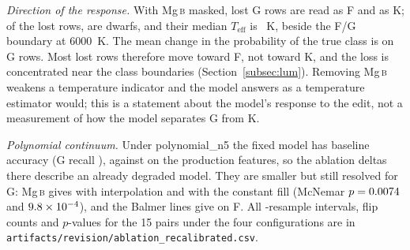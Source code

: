 \documentclass[11pt,a4paper]{article}
\newcommand{\Mgb}{Mg\,\textsc{b}\xspace}
\newcommand{\NaD}{Na\,\textsc{d}\xspace}
\newcommand{\CaI}{Ca\,\textsc{i}\xspace}
\newcommand{\FeCr}{Fe\,\textsc{i}/Cr\,\textsc{i}\xspace}
\newcommand{\Teff}{$T_{\mathrm{eff}}$\xspace}
\newcommand{\dA}{\Delta A}
\begin{document}
\emph{Direction of the response.} With \Mgb masked, \ablDestPrimMgGToF{} lost G rows are read as F and \ablDestPrimMgGToK{} as K; of the \focusMgGLost{} lost rows, \focusMgGDwarf{} are dwarfs, and their median \Teff is \focusMgGTeff~K, beside the F/G boundary at 6000~K. The mean change in the probability of the true class is \ablPrimMgGDp{} on G rows. Most lost rows therefore move toward F, not toward K, and the loss is concentrated near the class boundaries (Section~\ref{subsec:lum}). Removing \Mgb weakens a temperature indicator and the model answers as a temperature estimator would; this is a statement about the model's response to the edit, not a measurement of how the model separates G from K.

\emph{Polynomial continuum.} Under polynomial\_n5 the fixed model has baseline accuracy \ablBaseAccPoly{} (G recall \ablBaseRecGPoly), against \ablBaseAccPrim{} on the production features, so the ablation deltas there describe an already degraded model. They are smaller but still resolved for G: \Mgb gives \ablPolyMgGDelta{} with interpolation and \ablPolyConstMgGDelta{} with the constant fill (McNemar $p = 0.0074$ and $9.8\times10^{-4}$), and the Balmer lines give \ablPolyHbFDelta{} on F. All \ablNBoot-resample intervals, flip counts and $p$-values for the 15 pairs under the four configurations are in \texttt{artifacts/revision/ablation\_recalibrated.csv}.

\begin{table}[ht]
\centering
\caption{Masked-line ablation of the fixed production classifier on the \nTest{} test spectra. Production continuum, linear-interpolation fill, class-matched null of \ablNControls{} bin-matched random windows, \ablNBoot{} bootstrap resamples. $\dA$ is the change in class recall, with the 95 percent bootstrap interval; ``Flips'' are rows lost and gained; $p_{\mathrm{McN}}$ is the exact McNemar $p$; $\Delta\bar{P}_{\mathrm{true}}$ is the mean change in the probability of the true class; $p_{\mathrm{MC}} = (b+1)/(B+1)$ against the random-window null. The three headline pairs are (H Balmer, F), (\Mgb, G) and (\Mgb, K); (\NaD, K) and (\CaI, K) are pivot pairs, and all other rows are descriptive. The \FeCr set is post hoc.}
\label{tab:ablation}
\small
\resizebox{\textwidth}{!}{}
\end{table}
\end{document}
